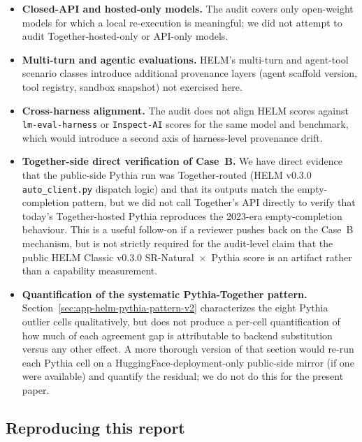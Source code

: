 \begin{itemize}
  \item \textbf{Closed-API and hosted-only models.}
        The audit covers only open-weight models for which a local
        re-execution is meaningful; we did not attempt to audit
        Together-hosted-only or API-only models.
  \item \textbf{Multi-turn and agentic evaluations.}
        HELM's multi-turn and agent-tool scenario classes introduce
        additional provenance layers (agent scaffold version, tool
        registry, sandbox snapshot) not exercised here.
  \item \textbf{Cross-harness alignment.}
        The audit does not align HELM scores against
        \texttt{lm-eval-harness} or \texttt{Inspect-AI} scores for
        the same model and benchmark, which would introduce a second
        axis of harness-level provenance drift.
  \item \textbf{Together-side direct verification of Case~B.}
        We have direct evidence that the public-side Pythia run was
        Together-routed (HELM v0.3.0 \texttt{auto\_client.py} dispatch
        logic) and that its outputs match the empty-completion
        pattern, but we did not call Together's API directly to
        verify that today's Together-hosted Pythia reproduces the
        2023-era empty-completion behaviour.
        This is a useful follow-on if a reviewer pushes back on the
        Case~B mechanism, but is not strictly required for the
        audit-level claim that the public HELM Classic v0.3.0
        SR-Natural~$\times$~Pythia score is an artifact rather than a
        capability measurement.
  \item \textbf{Quantification of the systematic Pythia-Together pattern.}
        Section~\ref{sec:app-helm-pythia-pattern-v2} characterizes
        the eight Pythia outlier cells qualitatively, but does not
        produce a per-cell quantification of how much of each
        agreement gap is attributable to backend substitution versus
        any other effect.
        A more thorough version of that section would re-run each
        Pythia cell on a HuggingFace-deployment-only public-side mirror
        (if one were available) and quantify the residual; we do not
        do this for the present paper.
\end{itemize}

\subsection{Reproducing this report}
\label{sec:app-helm-reproduce-v2}

